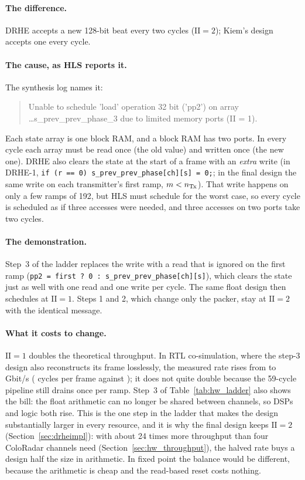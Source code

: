 \paragraph{The difference.} DRHE accepts a new 128-bit beat every two cycles
($\mathrm{II} = 2$); Kiem's design accepts one every cycle.

\paragraph{The cause, as HLS reports it.} The synthesis log names it:
\begin{quote}\footnotesize\ttfamily
Unable to schedule 'load' operation 32 bit ('pp2') on array\\
\dots s\_prev\_prev\_phase\_3 due to limited memory ports (II = 1).
\end{quote}
Each state array is one block RAM, and a block RAM has two ports. In every cycle
each array must be read once (the old value) and written once (the new one).
DRHE also clears the state at the start of a frame with an \emph{extra} write
(in DRHE-1, \texttt{if (r == 0) s\_prev\_prev\_phase[ch][s] = 0;}; in the final
design the same write on each transmitter's first ramp, $m < n_{\mathrm{Tx}}$). That write
happens on only a few ramps of 192, but HLS must schedule for the worst case,
so every cycle is scheduled as if three accesses were needed, and three accesses
on two ports take two cycles.

\paragraph{The demonstration.} Step~3 of the ladder replaces the write with a
read that is ignored on the first ramp
(\texttt{pp2 = first ? 0 : s\_prev\_prev\_phase[ch][s]}), which clears the state
just as well with one read and one write per cycle. The same float design then
schedules at $\mathrm{II} = 1$. Steps 1 and 2, which change only the packer,
stay at $\mathrm{II} = 2$ with the identical message.

\paragraph{What it costs to change.} $\mathrm{II} = 1$ doubles the theoretical
throughput. In RTL co-simulation, where the step-3 design also reconstructs its
frame losslessly, the measured rate rises from  to
\,Gbit/s ( cycles per frame
against ); it does not quite double because the 59-cycle
pipeline still drains once per ramp. Step~3 of Table~\ref{tab:hw_ladder} also
shows the bill: the float arithmetic can no longer be shared between channels,
so DSPs and logic both rise. This is the one step in the ladder that makes the
design substantially larger in every resource, and it is why the final design keeps
$\mathrm{II} = 2$ (Section~\ref{sec:drheimpl}): with about 24 times more
throughput than four ColoRadar channels need (Section~\ref{sec:hw_throughput}),
the halved rate buys a design half the size in arithmetic. In fixed point the
balance would be different, because the arithmetic is cheap and the read-based
reset costs nothing.

